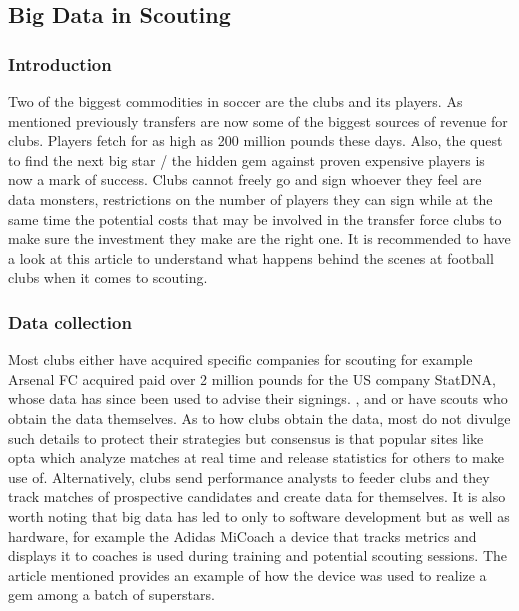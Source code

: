 \documentclass[sigconf]{acmart}
\begin{document}
\subsection{Big Data in Scouting}

\subsubsection{Introduction}

Two of the biggest commodities in soccer are the clubs and its players. As mentioned previously transfers are now some of the biggest sources of revenue for clubs. Players fetch for as high as 200 million pounds these days\cite{wikipedia}. Also, the quest to find the next big star / the hidden gem against proven expensive players is now a mark of success. Clubs cannot freely go and sign whoever they feel are data monsters, restrictions on the number of players they can sign while at the same time the potential costs that may be involved in the transfer force clubs to make sure the investment they make are the right one. It is recommended to have a look at this article to understand what happens behind the scenes at football clubs when it comes to scouting\cite{2012}.

\subsubsection{Data collection}

Most clubs either have acquired specific companies for scouting for example Arsenal FC acquired paid over 2 million pounds for the US company StatDNA, whose data has since been used to advise their signings. \cite{Outsideoftheboot2000}, and or have scouts who obtain the data themselves. As to how clubs obtain the data, most do not divulge such details to protect their strategies but consensus is that popular sites like opta which analyze matches at real time and release statistics for others to make use of\cite{Optasports2000}. Alternatively, clubs send performance analysts to feeder clubs and they track matches of prospective candidates and create data for themselves.\newline
It is also worth noting that big data has led to only to software development but as well as hardware, for example the Adidas MiCoach a device that tracks metrics and displays it to coaches is used during training and potential scouting sessions. The article mentioned provides an example of how the device was used to realize a gem among a batch of superstars\cite{2000}.
\end{document}
